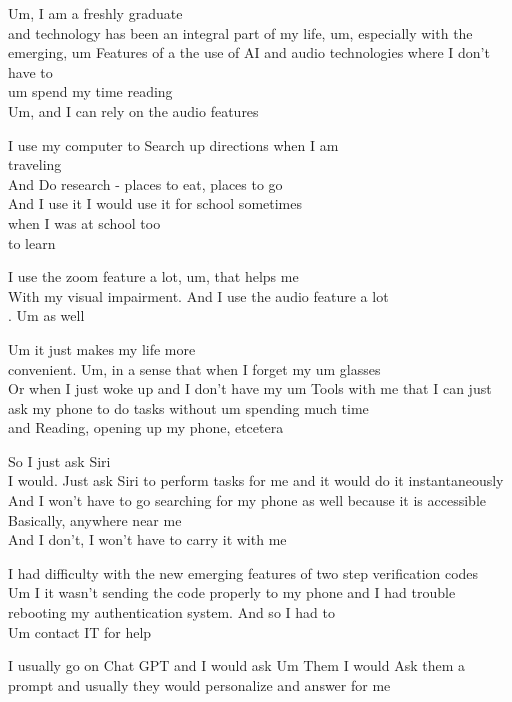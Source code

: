 \begin{description}[style=nextline,leftmargin=1.5em]
\item[P2 Q1.] Um, I am a freshly graduate\\
and technology has been an integral part of my life, um, especially with the emerging, um Features of a the use of AI and audio technologies where I don't have to\\
um spend my time reading\\
Um, and I can rely on the audio features
\item[P2 Q2.] I use my computer to Search up directions when I am\\
traveling\\
And Do research - places to eat, places to go\\
And I use it I would use it for school sometimes\\
when I was at school too\\
to learn
\item[P2 Q3.] I use the zoom feature a lot, um, that helps me\\
With my visual impairment. And I use the audio feature a lot\\
. Um as well
\item[P2 Q4.] Um it just makes my life more\\
convenient. Um, in a sense that when I forget my um glasses\\
Or when I just woke up and I don't have my um Tools with me that I can just ask my phone to do tasks without um spending much time\\
and Reading, opening up my phone, etcetera
\item[P2 Q5.] So I just ask Siri\\
I would. Just ask Siri to perform tasks for me and it would do it instantaneously\\
And I won't have to go searching for my phone as well because it is accessible Basically, anywhere near me\\
And I don't, I won't have to carry it with me
\item[P2 Q6.] I had difficulty with the new emerging features of two step verification codes\\
Um I it wasn't sending the code properly to my phone and I had trouble rebooting my authentication system. And so I had to\\
Um contact IT for help
\item[P2 Q7.] I usually go on Chat GPT and I would ask Um Them I would Ask them a prompt and usually they would personalize and answer for me\\

\end{description}
